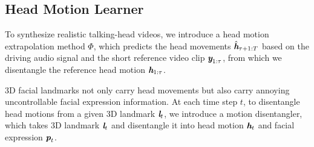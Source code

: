 \documentclass[runningheads]{llncs}
\def\mathbi#1{\textbf{\em #1}}
\begin{document}







\subsection{Head Motion Learner}
\label{subsec:head_mo}
To synthesize realistic talking-head videos, we introduce a head motion extrapolation method $\Phi$, which predicts the head movements $\hat{\mathbi{h}}_{\tau +1:T}$ based on the driving audio signal and the short reference video clip $\mathbi{y}_{1:\tau}$, from which we disentangle the reference head motion ${\mathbi{h}}_{1:\tau}$.

 \indent 3D facial landmarks not only carry head movements but also carry annoying uncontrollable facial expression information. At each time step $t$, to disentangle head motions from a given 3D landmark $\mathbi{l}_t$, we introduce a motion disentangler, which takes 3D landmark $\mathbi{l}_t$ and disentangle it into head motion $\mathbi{h}_{t}$ and facial expression ${\mathbi{p}}_{t}$.
 
\end{document}
